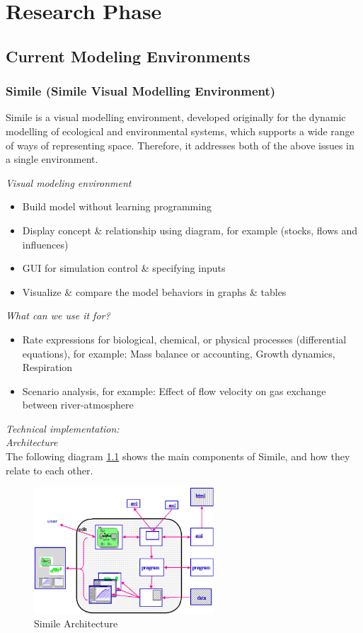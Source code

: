 \chapter{Research Phase}
\section{Current Modeling Environments}

\subsection{Simile (Simile Visual Modelling Environment)}
Simile is a visual modelling environment, developed originally for the dynamic modelling of ecological and environmental systems, which supports a wide range of ways of representing space. Therefore, it addresses both of the above issues in a single environment.

\emph{Visual modeling environment}
\begin{itemize}
	\item Build model without learning programming
	\item Display concept \& relationship using diagram, for example (stocks, flows and influences)
	\item GUI for simulation control \& specifying inputs
	\item Visualize \& compare the model behaviors in  graphs \& tables
\end{itemize}

\emph{What can we use it for?}
\begin{itemize}
	\item Rate expressions for biological, chemical, or physical processes (differential equations), for example: Mass balance or accounting, Growth dynamics, Respiration
	\item Scenario analysis, for example: Effect of flow velocity on gas exchange between  river-atmosphere
\end{itemize}

\emph{Technical implementation:}\\
\emph{Architecture}\\
The following diagram \ref{fig:Simile Architecture} shows the main components of Simile, and how they relate to each
other.

\begin{figure}[htbp]
\centering
\includegraphics[width=0.6\textwidth]{pics/simile/Simile_architecture.png}
\caption{Simile Architecture}
\label{fig:Simile Architecture}	
\end{figure}

